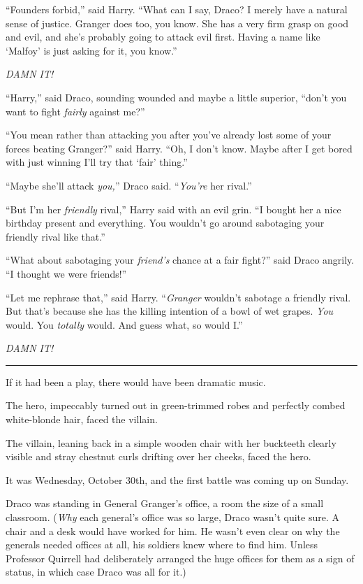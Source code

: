 ``Founders forbid,'' said Harry. ``What can I say, Draco? I merely have a natural sense of justice. Granger does too, you know. She has a very firm grasp on good and evil, and she's probably going to attack evil first. Having a name like `Malfoy' is just asking for it, you know.''

\emph{DAMN IT!}

``Harry,'' said Draco, sounding wounded and maybe a little superior, ``don't you want to fight \emph{fairly} against me?''

``You mean rather than attacking you after you've already lost some of your forces beating Granger?'' said Harry. ``Oh, I don't know. Maybe after I get bored with just winning I'll try that `fair' thing.''

``Maybe she'll attack \emph{you,}'' Draco said. ``\emph{You're} her rival.''

``But I'm her \emph{friendly} rival,'' Harry said with an evil grin. ``I bought her a nice birthday present and everything. You wouldn't go around sabotaging your friendly rival like that.''

``What about sabotaging your \emph{friend's} chance at a fair fight?'' said Draco angrily. ``I thought we were friends!''

``Let me rephrase that,'' said Harry. ``\emph{Granger} wouldn't sabotage a friendly rival. But that's because she has the killing intention of a bowl of wet grapes. \emph{You} would. You \emph{totally} would. And guess what, so would I.''

\emph{DAMN IT!}

\begin{center}\rule{3in}{0.4pt}\end{center}

If it had been a play, there would have been dramatic music.

The hero, impeccably turned out in green-trimmed robes and perfectly combed white-blonde hair, faced the villain.

The villain, leaning back in a simple wooden chair with her buckteeth clearly visible and stray chestnut curls drifting over her cheeks, faced the hero.

It was Wednesday, October 30th, and the first battle was coming up on Sunday.

Draco was standing in General Granger's office, a room the size of a small classroom. (\emph{Why} each general's office was so large, Draco wasn't quite sure. A chair and a desk would have worked for him. He wasn't even clear on why the generals needed offices at all, his soldiers knew where to find him. Unless Professor Quirrell had deliberately arranged the huge offices for them as a sign of status, in which case Draco was all for it.)

